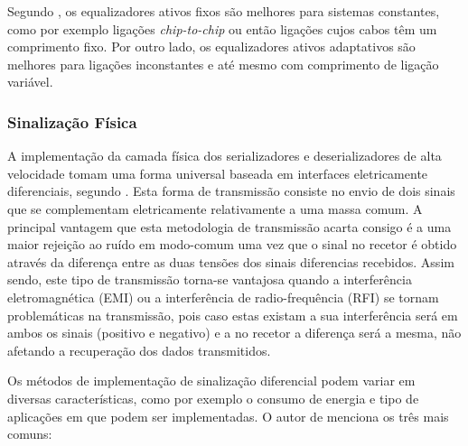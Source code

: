 Segundo \cite{R032}, os equalizadores ativos fixos são melhores para sistemas constantes, como por exemplo ligações \textit{chip-to-chip} ou então ligações cujos cabos têm um comprimento fixo. Por outro lado, os equalizadores ativos adaptativos são melhores para ligações inconstantes e até mesmo com comprimento de ligação variável.
%
%
%


\subsubsection*{Sinalização Física} \label{subsub:sinalizacao_fisica}


A implementação da camada física dos serializadores e deserializadores de alta velocidade tomam uma forma universal baseada em interfaces eletricamente diferenciais, segundo \cite{R032}. Esta forma de transmissão consiste no envio de dois sinais que se complementam eletricamente relativamente a uma massa comum. A principal vantagem que esta metodologia de transmissão acarta consigo é a uma maior rejeição ao ruído em modo-comum uma vez que o sinal no recetor é obtido através da diferença entre as duas tensões dos sinais diferencias recebidos. Assim sendo, este tipo de transmissão torna-se vantajosa quando a interferência eletromagnética (EMI) ou a interferência de radio-frequência (RFI) se tornam problemáticas na transmissão, pois caso estas existam a sua interferência será em ambos os sinais (positivo e negativo) e a no recetor a diferença será a mesma, não afetando a recuperação dos dados transmitidos.

Os métodos de implementação de sinalização diferencial podem variar em diversas características, como por exemplo o consumo de energia e tipo de aplicações em que podem ser implementadas. O autor de \cite{R032} menciona os três mais comuns:


